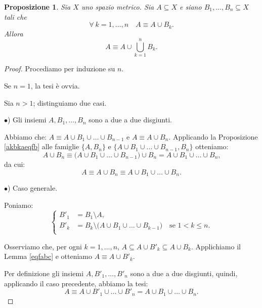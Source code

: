 \documentclass[a4paper,oneside,11pt]{book}
\theoremstyle{definition} \newtheorem{Def}{Definizione}
\theoremstyle{plain} \newtheorem{teo}{Teorema}
\theoremstyle{plain} \newtheorem{cor}[teo]{Corollario}
\theoremstyle{definition} \newtheorem{lem}[teo]{Lemma}
\theoremstyle{plain} \newtheorem{pro}[teo]{Proposizione}
\newcommand{\eqf}{\equiv}
\begin{document}
	\begin{pro}\label{aubkaub} %
		Sia $X$ uno spazio metrico. Sia $A \subseteq X$ e siano $B_1, \dots, B_n \subseteq X$ tali che
		\begin{equation*}
			\forall\ k = 1, \dots, n \quad A \eqf A \cup B_k \text{.}
		\end{equation*}
		Allora
		\begin{equation*}
			A \eqf A \cup \bigcup_{k=1}^n B_k \text{.}
		\end{equation*}
	\end{pro}
	
	\begin{proof}
		Procediamo per induzione su $n$.
		
		Se $n=1$, la tesi è ovvia.
		
		Sia $n>1$; distinguiamo due casi.
		
		$\bullet$) Gli insiemi $A, B_1, \dots, B_n$ sono a due a due disgiunti.

		Abbiamo che: $A \eqf A \cup B_1 \cup \dots \cup B_{n-1}$ e $A \eqf A \cup B_n$. Applicando la Proposizione \ref{akbkaeqfb} alle famiglie $\{A, B_n\}$ e $\{A \cup B_1 \cup \dots \cup B_{n-1}, B_n\}$ otteniamo:
		\begin{equation*}
		 	A \cup B_n \eqf \big(A \cup B_1 \cup \dots \cup B_{n-1} \big) \cup B_n = A \cup B_1 \cup \dots \cup B_n \text{,}
		\end{equation*}
		da cui:
		\begin{equation*}
			A \eqf A \cup B_n \eqf A \cup B_1 \cup \dots \cup B_n \text{.}
		\end{equation*}
		 
		$\bullet$) Caso generale.
		 
		Poniamo:
		\begin{equation*}
			\left\{\begin{aligned}
				B'_1 &= B_1 \setminus A \text{,}\\
				B'_k &= B_k \setminus \big(A \cup B_1 \cup \dots \cup B_{k-1}\big)\quad  \text{se } 1 < k \leq n \text{.}\\
			\end{aligned}\right.
		\end{equation*}
		
		Osserviamo che, per ogni $k = 1, \dots, n$, $A \subseteq A \cup B'_k \subseteq A \cup B_k$. Applichiamo il Lemma \ref{eqfabc} e otteniamo $A \eqf A \cup B'_k$.
		
		Per definizione gli insiemi $A, B'_1, \dots, B'_n$ sono a due a due disgiunti, quindi, applicando il caso precedente, abbiamo la tesi:
		\begin{equation*}
			A \eqf A \cup B'_1 \cup \dots \cup B'_n = A \cup B_1 \cup \dots \cup B_n \text{.}
		\end{equation*}
		 
	\end{proof}
	
\end{document}
